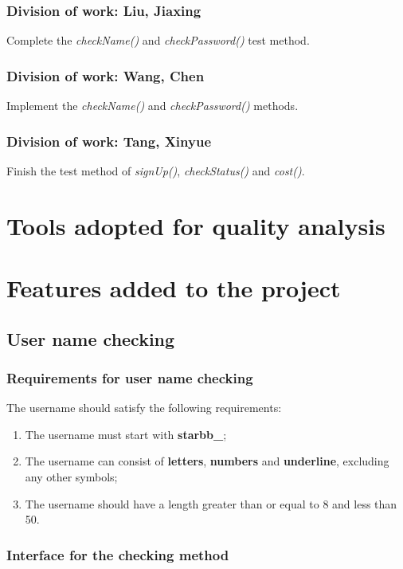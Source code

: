 \documentclass[a4paper]{report}
\begin{document}
\subsection{Division of work: Liu, Jiaxing}
Complete the \emph{checkName()} and \emph{checkPassword()} test method.
\subsection{Division of work: Wang, Chen}
Implement the \emph{checkName()} and \emph{checkPassword()} methods.
\subsection{Division of work: Tang, Xinyue}
Finish the test method of \emph{signUp()}, \emph{checkStatus()} and \emph{cost()}.


\chapter{Tools adopted for quality analysis}






\chapter{Features added to the project}
\section{User name checking}
\subsection{Requirements for user name checking}
The username should satisfy the following requirements:
\begin{enumerate}
\item The username must start with \textbf{starbb\_};
\item The username can consist of \textbf{letters}, \textbf{numbers} and \textbf{underline}, excluding any other symbols;
\item The username should have a length greater than or equal to 8 and less than 50.
\end{enumerate}
\subsection{Interface for the checking method}
\end{document}
